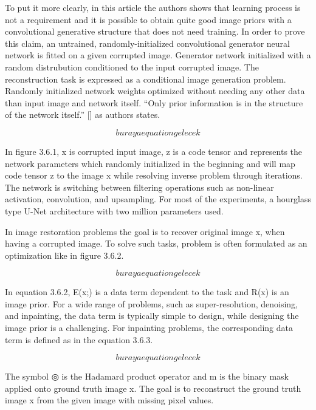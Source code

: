 To put it more clearly, in this article the authors shows that learning process is not a requirement and it is possible to obtain quite good image priors with a convolutional generative structure that does not need training. In order to prove this claim, an untrained, randomly-initialized convolutional generator neural network is fitted on a given corrupted image. Generator network initialized with a random distrubution conditioned to the input corrupted image. The reconstruction task is expressed as a conditional image generation problem. Randomly initialized network weights optimized without needing any other data than input image and network itself. “Only prior information is in the structure of the network itself.” [] as authors states.

\begin{equation}
    buraya equation gelecek
\end{equation}

In figure 3.6.1, x is corrupted input image, z is a code tensor and  represents the network parameters which randomly initialized in the beginning and will map code tensor z to the image x while resolving inverse problem through iterations. The network is switching between filtering operations such as non-linear activation, convolution, and upsampling. For most of the experiments, a hourglass type U-Net architecture with two million parameters used.

In image restoration problems the goal is to recover original image x, when having a corrupted image. To solve such tasks, problem is often formulated as an optimization like in figure 3.6.2.

\begin{equation}
    buraya equation gelecek
\end{equation}

In equation 3.6.2, E(x;) is a data term dependent to the task and R(x) is an image prior. For a wide range of problems, such as super-resolution, denoising, and inpainting, the data term is typically simple to design, while designing the image prior is a challenging. For inpainting problems, the corresponding data term is defined as in the equation 3.6.3.

\begin{equation}
    buraya equation gelecek
\end{equation}

The symbol ◎ is the Hadamard product operator and m is the binary mask applied onto ground truth image x. The goal is to reconstruct the ground truth image x from the given image  with missing pixel values.

